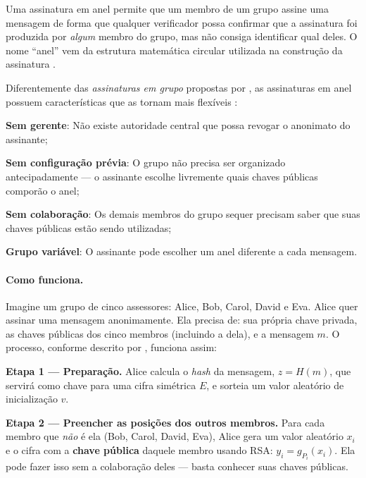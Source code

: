 Uma assinatura em anel permite que um membro de um grupo assine uma mensagem de forma que qualquer verificador possa confirmar que a assinatura foi produzida por \textit{algum} membro do grupo, mas não consiga identificar qual deles. O nome ``anel'' vem da estrutura matemática circular utilizada na construção da assinatura \cite{tomaz2014}.

Diferentemente das \textit{assinaturas em grupo} propostas por , as assinaturas em anel possuem características que as tornam mais flexíveis \cite{rivest2001, tomaz2014}:

\begin{alineas}
    \item \textbf{Sem gerente}: Não existe autoridade central que possa revogar o anonimato do assinante;
    \item \textbf{Sem configuração prévia}: O grupo não precisa ser organizado antecipadamente --- o assinante escolhe livremente quais chaves públicas comporão o anel;
    \item \textbf{Sem colaboração}: Os demais membros do grupo sequer precisam saber que suas chaves públicas estão sendo utilizadas;
    \item \textbf{Grupo variável}: O assinante pode escolher um anel diferente a cada mensagem.
\end{alineas}

\paragraph{Como funciona.}

Imagine um grupo de cinco assessores: Alice, Bob, Carol, David e Eva. Alice quer assinar uma mensagem anonimamente. Ela precisa de: sua própria chave privada, as chaves públicas dos cinco membros (incluindo a dela), e a mensagem $m$. O processo, conforme descrito por , funciona assim:

\textbf{Etapa 1 --- Preparação.} Alice calcula o \textit{hash} da mensagem, $z = H(m)$, que servirá como chave para uma cifra simétrica $E$, e sorteia um valor aleatório de inicialização $v$.

\textbf{Etapa 2 --- Preencher as posições dos outros membros.} Para cada membro que \textit{não} é ela (Bob, Carol, David, Eva), Alice gera um valor aleatório $x_i$ e o cifra com a \textbf{chave pública} daquele membro usando RSA: $y_i = g_{P_i}(x_i)$. Ela pode fazer isso sem a colaboração deles --- basta conhecer suas chaves públicas.

